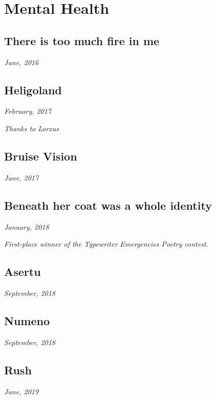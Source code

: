 \chapter{Mental Health}
\thispagestyle{empty}
\newpage


\section*{There is too much fire in me}

\hfill\textit{June, 2016}


\newpage


\section*{Heligoland}

\hfill\textit{February, 2017}



\textit{Thanks to Lorxus}
\newpage


\section*{Bruise Vision}

\hfill\textit{June, 2017}


\newpage


\section*{Beneath her coat was a whole identity}

\hfill\textit{January, 2018}



\textit{First-place winner of the Typewriter Emergencies Poetry contest.}
\newpage


\section*{Asertu}

\hfill\textit{September, 2018}


\newpage


\section*{Numeno}

\hfill\textit{September, 2018}


\newpage


\section*{Rush}

\hfill\textit{June, 2019}


